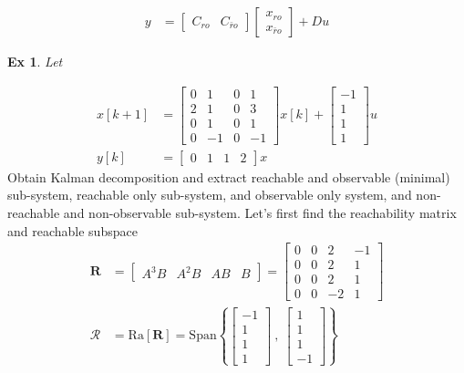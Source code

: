 \documentclass[twoside]{article}
\newtheorem{exmp}[theorem]{Ex}
\begin{document}
\begin{itemize}
\begin{align*}
        \\
        y &= \left[ \begin{array}{c|c} C_{ro} & C_{\bar{r}o} \end{array} \right] \begin{bmatrix} x_{ro} \\ x_{\bar{r}o}\end{bmatrix} + D u
    \end{align*}
\end{itemize}

\begin{exmp}
Let
\end{exmp}
\begin{align*}
    x[k+1] &= \left[ \begin{array}{cccc} 0 & 1 & 0 & 1 \\ 
    2 & 1 & 0 & 3 \\ 
    0 & 1 & 0 & 1 \\ 
    0 & -1 & 0 & -1 
    \end{array} \right] x[k] + 
    \left[ \begin{array}{c} -1 \\ 
    1 \\ 
    1 \\ 
    1
    \end{array} \right] u
    \\
    y[k] &= \left[ \begin{array}{cccc} 0 & 1 & 1 & 2 \end{array} \right] x
\end{align*}
%
Obtain Kalman decomposition and extract  reachable and observable (minimal) sub-system, reachable only sub-system, and observable only system,
and non-reachable and non-observable sub-system.
%
Let's first find the reachability matrix and reachable subspace 
%
\begin{align*}
    \mathbf{R} &= \left[ \begin{array}{c|c|c|c} A^3 B & A^2 B & A B & B \end{array} \right] 
    =
    \left[ \begin{array}{cccc} 0 & 0 & 2 & -1 \\ 
    0 & 0 & 2 & 1 \\ 
    0 & 0 & 2 & 1 \\ 
    0 & 0 & -2 & 1 
    \end{array} \right] 
    \\
    \mathcal{R} &= \mathrm{Ra}[ \mathbf{R} ] = \mathrm{Span} \left\lbrace 
    \left[ \begin{array}{c} -1 \\  1 \\  1 \\  1  \end{array} \right] 
    \ , \
    \left[ \begin{array}{c} 1 \\  1 \\  1 \\  -1  \end{array} \right] 
    \right\rbrace
\end{align*}
\end{document}
